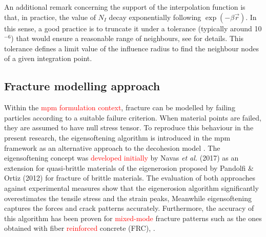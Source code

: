 \documentclass[preprint,12pt,a4paper]{elsarticle}
\begin{document}
An additional remark concerning the support of the interpolation function is that, in practice, the value of $N_I$ decay exponentially following $\exp(-\beta \vec{r})$. In this sense,
a good practice is to truncate it under a tolerance  (typically around 10$^{-6}$) that would ensure a reasonable
range of neighbours, see \cite{Arroyo2006} for details. This tolerance
defines a limit value of the influence radius to find the neighbour
nodes of a given integration point.

\subsection{Fracture modelling approach}
\label{sec:2.3}
Within the \textcolor{red}{\acrshort{mpm} formulation context}, fracture can be
modelled by failing particles according to a suitable failure
criterion. When material points are failed, they are assumed to have
null stress tensor. To reproduce this behaviour in the present
research, the eigensoftening algorithm is introduced in the 
\acrshort{mpm} framework as an alternative approach to the decohesion
model \cite{Schreyer_2002}. The eigensoftening concept
was \textcolor{red}{developed initially} by Navas {\it et al.}
(2017)\cite{Navas_2017_ES} as an extension for quasi-brittle materials
of the eigenerosion proposed by Pandolfi \& Ortiz
(2012)\cite{Pandolfi_2012} for fracture of brittle materials. The
  evaluation of both approaches \cite{Navas_2017_ES} against
  experimental measures show that the eigenerosion algorithm significantly overestimates the tensile stress and the strain peaks, Meanwhile eigensoftening captures the forces and crack
patterns accurately. Furthermore, the accuracy of this algorithm has been proven for \textcolor{red}{mixed-mode} fracture patterns such as the ones obtained with fiber \textcolor{red}{reinforced} concrete (FRC),
\cite{Navas_2018_ES}.\\
\end{document}
